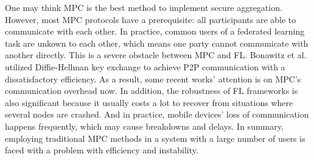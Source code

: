 One may think MPC is the best method to implement secure aggregation. However, most MPC protocols have a prerequisite: all participants are able to communicate with each other. In practice, common users of a federated learning task are unkown to each other, which means one party cannot communicate with another directly. This is a severe obstacle between MPC and FL. Bonawitz et al.\cite{Practical} utilized Diffie-Hellman key exchange to achieve P2P communication with a dissatisfactory efficiency. As a result, some recent works' attention is on MPC's communication overhead now\cite{Weighted,Two-Phase}. In addition, the robustness of FL frameworks is also significant because it usually costs a lot to recover from situations where several nodes are crashed. And in practice, mobile devices' loss of communication happens frequently, which may cause breakdowns and delays. In summary, employing traditional MPC methods in a system with a large number of users is faced with a problem with efficiency and instability.




